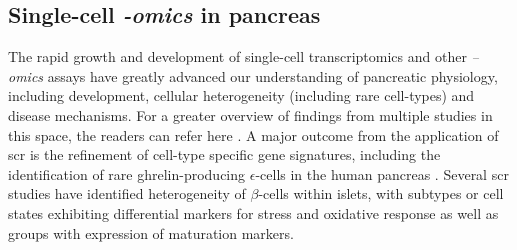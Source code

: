 \subsection{Single-cell \textit{-omics} in pancreas}
\label{sec:single-cell_pancreas}
The rapid growth and development of single-cell transcriptomics and other \textit{–omics} assays have greatly advanced our understanding of pancreatic physiology, including development, cellular heterogeneity (including rare cell-types) and disease mechanisms. For a greater overview of findings from multiple studies in this space, the readers can refer here \textbf{\cite{wang_single-cell_2019,avrahami_beta_2017,carrano_interrogating_2017}}. A major outcome from the application of \gls{scr} is the refinement of cell-type specific gene signatures, including the identification of rare ghrelin-producing $\epsilon$-cells in the human pancreas \textbf{\cite{segerstolpe_single-cell_2016}}. Several \gls{scr} studies have identified heterogeneity of $\beta$-cells within islets, with subtypes \textbf{\cite{segerstolpe_single-cell_2016}} or cell states exhibiting differential markers for  stress \textbf{\cite{baron_single-cell_2016,muraro_single-cell_2016}} and oxidative response \textbf{\cite{muraro_single-cell_2016}} as well as groups with expression of maturation markers.\\\\
